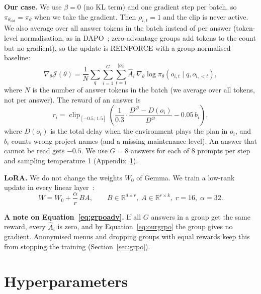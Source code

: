 \documentclass{article}
\begin{document}
\textbf{Our case.} We use $\beta=0$ (no KL term) and one gradient step per batch, so $\pi_{\theta_{\text{old}}}=\pi_\theta$ when we take the gradient. Then $\rho_{i,t}=1$ and the clip is never active. We also average over all answer tokens in the batch instead of per answer (token-level normalisation, as in DAPO~\cite{yu2025}; zero-advantage groups add tokens to the count but no gradient), so the update is REINFORCE with a group-normalised baseline:
\begin{equation}\label{eq:ourgrpo}
\nabla_\theta\mathcal{J}(\theta)=\frac{1}{N}\sum_{q}\sum_{i=1}^{G}\sum_{t=1}^{|o_i|}\hat A_{i}\,\nabla_\theta\log\pi_\theta(o_{i,t}\mid q,o_{i,<t}),
\end{equation}
where $N$ is the number of answer tokens in the batch (we average over all tokens, not per answer). The reward of an answer is
\begin{equation}
r_i=\operatorname{clip}_{[-0.5,\,1.5]}\!\left(\frac{1}{0.3}\cdot\frac{D^{\varnothing}-D(o_i)}{D^{\varnothing}}-0.05\,b_i\right),
\end{equation}
where $D(o_i)$ is the total delay when the environment plays the plan in $o_i$, and $b_i$ counts wrong project names (and a missing maintenance level). An answer that cannot be read gets $-0.5$. We use $G=8$ answers for each of 8 prompts per step and sampling temperature 1 (Appendix~\ref{app:hyper}).

\textbf{LoRA.} We do not change the weights $W_0$ of Gemma. We train a low-rank update in every linear layer~\cite{hu2022}:
\begin{equation}
W=W_0+\frac{\alpha}{r}\,BA,\qquad B\in\mathbb{R}^{d\times r},\;A\in\mathbb{R}^{r\times k},\;r=16,\;\alpha=32 .
\end{equation}

\textbf{A note on Equation~\ref{eq:grpoadv}.} If all $G$ answers in a group get the same reward, every $\hat A_i$ is zero, and by Equation~\ref{eq:ourgrpo} the group gives no gradient. Anonymised menus and dropping groups with equal rewards keep this from stopping the training (Section~\ref{sec:grpo}).

\section{Hyperparameters}\label{app:hyper}
\end{document}
